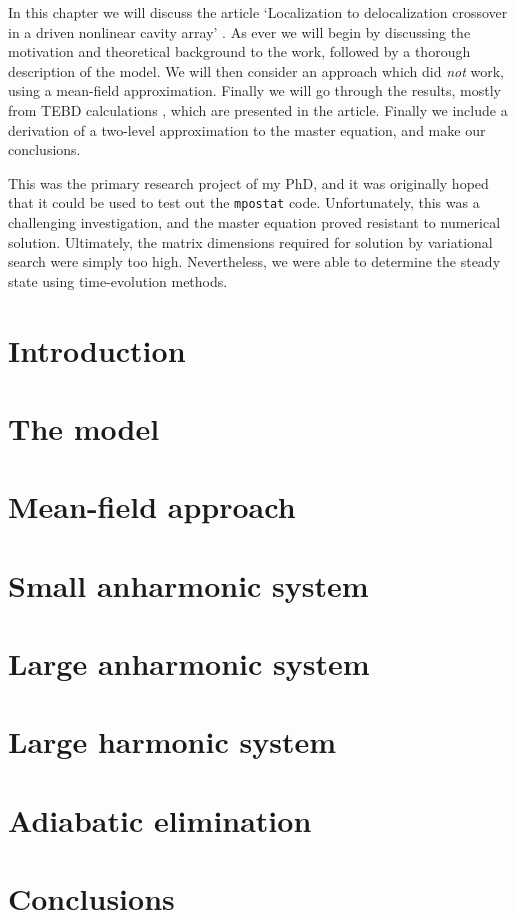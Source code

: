 In this chapter we will discuss the article `Localization to delocalization crossover in a driven nonlinear cavity array' \cite{Brown2018}. As ever we will begin by discussing the motivation and theoretical background to the work, followed by a thorough description of the model. We will then consider an approach which did \emph{not} work, using a mean-field approximation. Finally we will go through the results, mostly from TEBD calculations \cite{Vidal2003}, which are presented in the article. Finally we include a derivation of a two-level approximation to the master equation, and make our conclusions.

This was the primary research project of my PhD, and it was originally hoped that it could be used to test out the \lstinline$mpostat$ code. Unfortunately, this was a challenging investigation, and the master equation proved resistant to numerical solution. Ultimately, the matrix dimensions required for solution by variational search were simply too high. Nevertheless, we were able to determine the steady state using time-evolution methods. 

\section{Introduction}

\section{The model}

\section{Mean-field approach}

\section{Small anharmonic system}

\section{Large anharmonic system}

\section{Large harmonic system}

\section{Adiabatic elimination}

\section{Conclusions}
